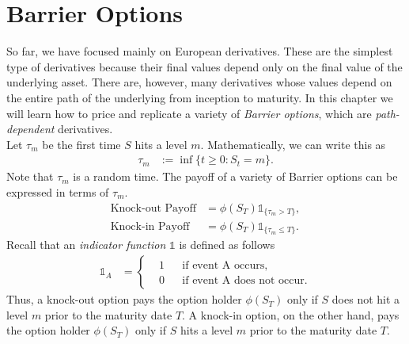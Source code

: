 \documentclass[12pt]{book}
\numberwithin{equation}{chapter}
\theoremstyle{plain}
\numberwithin{theorem}{section}
\theoremstyle{definition}
\numberwithin{exercise}{chapter}
\newcommand{\<}{\langle}
\renewcommand{\>}{\rangle}
\renewcommand{\(}{\left(}
\renewcommand{\)}{\right)}
\renewcommand{\[}{\left[}
\renewcommand{\]}{\right]}
\newcommand\Ib{\mathds{1}}
\theoremstyle{definition}
\numberwithin{question}{section}
\begin{document}



\chapter{Barrier Options}
So far, we have focused mainly on European derivatives.  These are the simplest type of derivatives because their final values depend only on the final value of the underlying asset.  There are, however, many derivatives whose values depend on the entire path of the underlying from inception to maturity.  
In this chapter we will learn how to price and replicate a variety of \textit{Barrier options}, which are \textit{path-dependent} derivatives.
\\[0.5em]
Let $\tau_m$ be the first time $S$ hits a level $m$.  Mathematically, we can write this as
\begin{align}
\tau_m 
	&:= \inf \{ t \geq 0 : S_t = m \} .
\end{align}
Note that $\tau_m$ is a random time.  
The payoff of a variety of {Barrier options} can be expressed in terms of $\tau_m$. 
\begin{align}
\text{Knock-out Payoff} 
		&= \phi(S_T) \Ib_{\{ \tau_m > T \}} , \\
\text{Knock-in Payoff} 
		&= \phi(S_T) \Ib_{\{ \tau_m \leq T \}} .
\end{align}
Recall that an \textit{indicator function} $\Ib$ is defined as follows
\begin{align}
\Ib_A
	&=	\left\{ \begin{aligned}
			&1 && \text{if event A occurs}, \\
			&0	&& \text{if event A does not occur} .
			\end{aligned} \right. 
\end{align}
Thus, a knock-out option pays the option holder $\phi(S_T)$ only if $S$ does not hit a level $m$ prior to the maturity date $T$.
A knock-in option, on the other hand, pays the option holder $\phi(S_T)$ only if $S$ hits a level $m$ prior to the maturity date $T$.
\end{document}
